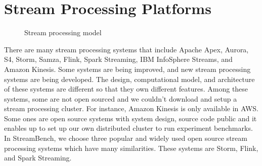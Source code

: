 
\chapter{Stream Processing Platforms}
\label{chapter:platform}

\begin{figure}
  \begin{center}
   \caption{Stream processing model}
   \label{fig:stream_process_model}
  \end{center}
\end{figure}

There are many stream processing systems that include Apache Apex, Aurora, S4, Storm, Samza, Flink, Spark Streaming, IBM InfoSphere Streams, and Amazon Kinesis. Some systems are being improved, and new stream processing systems are being developed. The design, computational model, and architecture of these systems are different so that they own different features. Among these systems, some are not open sourced and we couldn't download and setup a stream processing cluster. For instance, Amazon Kinesis is only available in AWS. Some ones are open source systems with system design, source code public and it enables up to set up our own distributed cluster to run experiment benchmarks. In StreamBench, we choose three popular and widely used open source stream processing systems which have many similarities. These systems are Storm, Flink, and Spark Streaming. 


